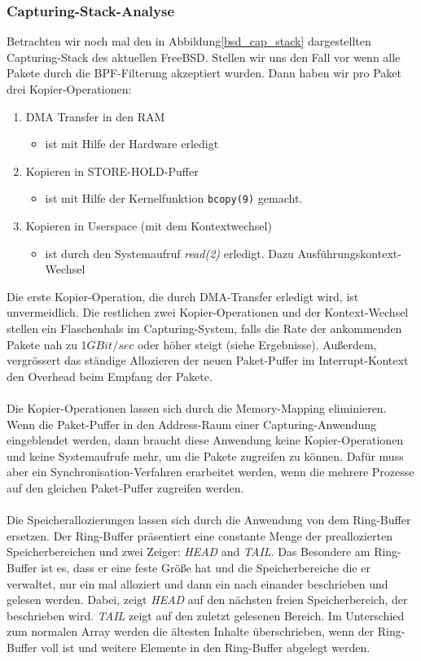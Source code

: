 \subsubsection{Capturing-Stack-Analyse}
Betrachten wir noch mal den in Abbildung\ref{bsd_cap_stack} dargestellten
Capturing-Stack des aktuellen FreeBSD. Stellen wir uns den Fall vor wenn alle
Pakete durch die BPF-Filterung akzeptiert wurden. Dann haben wir pro Paket drei
Kopier-Operationen:
\begin{enumerate}
\item DMA Transfer in den RAM
	\begin{itemize}
		\item ist mit Hilfe der Hardware erledigt
	\end{itemize}
\item Kopieren in STORE-HOLD-Puffer
	\begin{itemize}
		\item ist mit Hilfe der Kernelfunktion \verb+bcopy(9)+ gemacht. 
	\end{itemize}
\item Kopieren in Userspace (mit dem Kontextwechsel)
	\begin{itemize}
		\item ist durch den Systemaufruf \emph{read(2)} erledigt. Dazu 
			Ausführungskontext-Wechsel
	\end{itemize}
\end{enumerate}
Die erste Kopier-Operation, die durch DMA-Transfer erledigt wird, ist
unvermeidlich. Die restlichen zwei Kopier-Operationen und der Kontext-Wechsel
stellen ein Flaschenhals im Capturing-System, falls die Rate der ankommenden
Pakete nah zu $1GBit/sec$ oder höher steigt (siehe Ergebnisse).  Außerdem,
vergrössert das ständige Allozieren der neuen Paket-Puffer im Interrupt-Kontext
den Overhead beim Empfang der Pakete.\\\\
%
Die Kopier-Operationen lassen sich durch die Memory-Mapping eliminieren. Wenn
die Paket-Puffer in den Address-Raum einer Capturing-Anwendung eingeblendet
werden, dann braucht diese Anwendung keine Kopier-Operationen und keine
Systemaufrufe mehr, um die Pakete zugreifen zu können. Dafür muss aber ein 
Synchronisation-Verfahren erarbeitet werden, wenn die mehrere Prozesse auf 
den gleichen Paket-Puffer zugreifen werden.\\\\
%
Die Speicherallozierungen lassen sich durch die Anwendung von dem Ring-Buffer
ersetzen. Der Ring-Buffer präsentiert eine constante Menge der preallozierten
Speicherbereichen und zwei Zeiger: \emph{HEAD} and \emph{TAIL}. Das Besondere am
Ring-Buffer ist es, dass er eine feste Größe hat und die Speicherbereiche die er
verwaltet, nur ein mal alloziert und dann ein nach einander beschrieben und
gelesen werden. Dabei, zeigt \emph{HEAD} auf den nächsten freien
Speicherbereich, der beschrieben wird. \emph{TAIL} zeigt auf den zuletzt
gelesenen Bereich. Im Unterschied zum normalen Array werden die ältesten Inhalte
überschrieben, wenn der Ring-Buffer voll ist und weitere Elemente in den
Ring-Buffer abgelegt werden.
